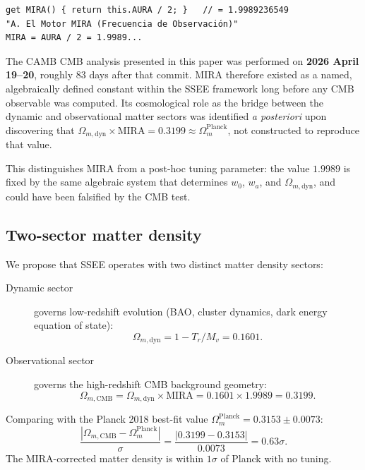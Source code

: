 \documentclass[12pt,a4paper]{article}
\begin{document}
\begin{verbatim}
get MIRA() { return this.AURA / 2; }   // = 1.9989236549
"A. El Motor MIRA (Frecuencia de Observación)"
MIRA = AURA / 2 = 1.9989...
\end{verbatim}

The CAMB CMB analysis presented in this paper was performed on
\textbf{2026 April 19--20}, roughly 83 days after that commit.
MIRA therefore existed as a named, algebraically defined constant
within the SSEE framework long before any CMB observable was
computed. Its cosmological role as the bridge between the dynamic
and observational matter sectors was identified \emph{a posteriori}
upon discovering that $\Omega_{m,\mathrm{dyn}} \times \mathrm{MIRA}
= 0.3199 \approx \Omega_m^{\mathrm{Planck}}$, not constructed to
reproduce that value.

This distinguishes MIRA from a post-hoc tuning parameter: the value
$1.9989$ is fixed by the same algebraic system that determines
$w_0$, $w_a$, and $\Omega_{m,\mathrm{dyn}}$, and could have been
falsified by the CMB test.

\subsection{Two-sector matter density}

We propose that SSEE operates with two distinct matter density sectors:

\begin{description}
  \item[Dynamic sector] governs low-redshift evolution (BAO, cluster dynamics,
    dark energy equation of state):
    \begin{equation}
      \Omega_{m,\mathrm{dyn}} = 1 - T_r/M_v = 0.1601.
    \end{equation}
  \item[Observational sector] governs the high-redshift CMB background geometry:
    \begin{equation}
      \Omega_{m,\mathrm{CMB}} = \Omega_{m,\mathrm{dyn}} \times \mathrm{MIRA}
      = 0.1601 \times 1.9989 = 0.3199.
    \end{equation}
\end{description}

Comparing with the Planck 2018 best-fit value $\Omega_m^{\mathrm{Planck}}=0.3153\pm0.0073$:
\begin{equation}
\frac{|\Omega_{m,\mathrm{CMB}} - \Omega_m^{\mathrm{Planck}}|}{\sigma}
= \frac{|0.3199-0.3153|}{0.0073} = 0.63\sigma.
\end{equation}
The MIRA-corrected matter density is within $1\sigma$ of Planck with no tuning.
\end{document}
